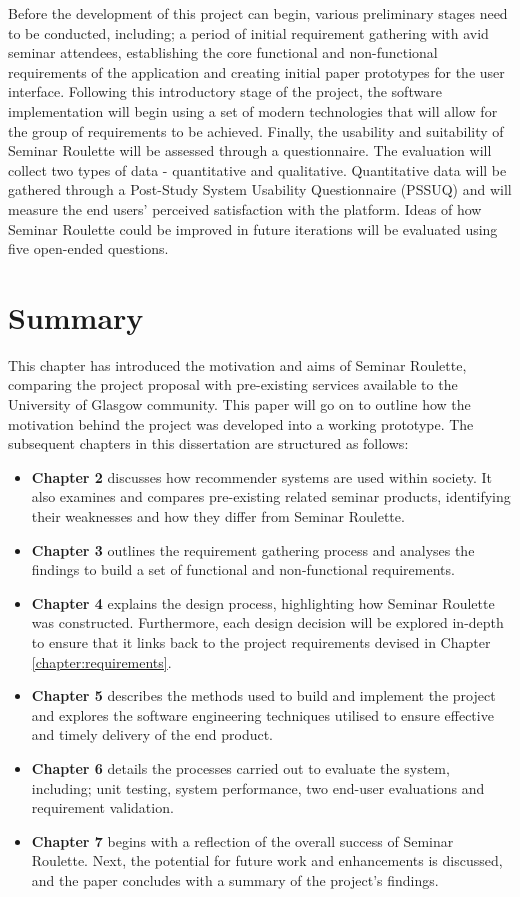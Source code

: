\documentclass{l4proj}
\begin{document}
Before the development of this project can begin, various preliminary stages need to be conducted, including; a period of initial requirement gathering with avid seminar attendees, establishing the core functional and non-functional requirements of the application and creating initial paper prototypes for the user interface. Following this introductory stage of the project, the software implementation will begin using a set of modern technologies that will allow for the group of requirements to be achieved. Finally, the usability and suitability of Seminar Roulette will be assessed through a questionnaire. The evaluation will collect two types of data - quantitative and qualitative. Quantitative data will be gathered through a Post-Study System Usability Questionnaire (PSSUQ) and will measure the end users' perceived satisfaction with the platform. Ideas of how Seminar Roulette could be improved in future iterations will be evaluated using five open-ended questions.

\section{Summary}

This chapter has introduced the motivation and aims of Seminar Roulette, comparing the project proposal with pre-existing services available to the University of Glasgow community. This paper will go on to outline how the motivation behind the project was developed into a working prototype. The subsequent chapters in this dissertation are structured as follows:

\begin{itemize}
    \item \textbf{Chapter 2} discusses how recommender systems are used within society. It also examines and compares pre-existing related seminar products, identifying their weaknesses and how they differ from Seminar Roulette.
    \item \textbf{Chapter 3} outlines the requirement gathering process and analyses the findings to build a set of functional and non-functional requirements.
    \item \textbf{Chapter 4} explains the design process, highlighting how Seminar Roulette was constructed. Furthermore, each design decision will be explored in-depth to ensure that it links back to the project requirements devised in Chapter \ref{chapter:requirements}.
    \item \textbf{Chapter 5} describes the methods used to build and implement the project and explores the software engineering techniques utilised to ensure effective and timely delivery of the end product. 
    \item \textbf{Chapter 6} details the processes carried out to evaluate the system, including; unit testing, system performance, two end-user evaluations and requirement validation.
    \item \textbf{Chapter 7} begins with a reflection of the overall success of Seminar Roulette. Next, the potential for future work and enhancements is discussed, and the paper concludes with a summary of the project's findings.
\end{itemize}
\end{document}
